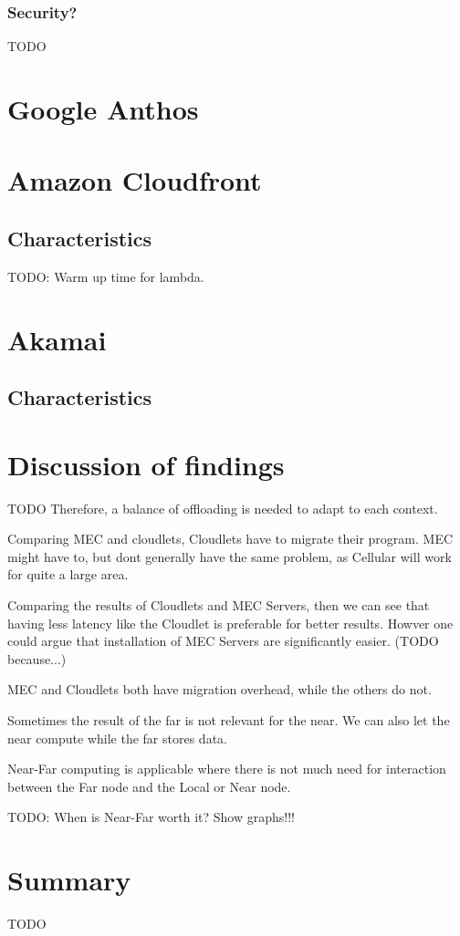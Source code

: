 \subsubsection{Security?}
TODO

\section{Google Anthos}

\section{Amazon Cloudfront}
\subsection{Characteristics}
TODO: Warm up time for lambda.

\section{Akamai}
\subsection{Characteristics}



\section{Discussion of findings}
TODO
Therefore, a balance of offloading is needed to adapt to each context.
 
Comparing MEC and cloudlets, Cloudlets have to migrate their program. MEC might have to, but dont generally have the same problem, as Cellular will work for quite a large area.

Comparing the results of Cloudlets and MEC Servers, then we can see that having less latency like the Cloudlet is preferable for better results. Howver one could argue that installation of MEC Servers are significantly easier. (TODO because...)


MEC and Cloudlets both have migration overhead, while the others do not.

Sometimes the result of the far is not relevant for the near. We can also let the near compute while the far stores data.

Near-Far computing is applicable where there is not much need for interaction between the Far node and the Local or Near node.


TODO: When is Near-Far worth it? Show graphs!!!

\section{Summary}
TODO
